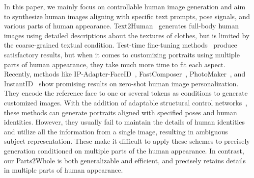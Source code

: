 In this paper, we mainly focus on controllable human image generation and aim to synthesize human images aligning with specific text prompts, pose signals, and various parts of human appearance. Text2Human~\cite{jiang2022text2human} generates full-body human images using detailed descriptions about the textures of clothes, but is limited by the coarse-grained textual condition. Test-time fine-tuning methods~\cite{ruiz2023dreambooth,hu2021lora,kumari2023customdiffusion} produce satisfactory results, but when it comes to customizing portraits using multiple parts of human appearance, they take much more time to fit each aspect. Recently, methods like IP-Adapter-FaceID~\cite{ye2023ipadapter}, FastComposer~\cite{xiao2023fastcomposer}, PhotoMaker~\cite{li2023photomaker}, and InstantID~\cite{wang2024instantid} show promising results on zero-shot human image personalization. They encode the reference face to one or several tokens as conditions to generate customized images. With the addition of adaptable structural control networks~\cite{zhang2023controlnet, mou2023t2iadapter}, these methods can generate portraits aligned with specified poses and human identities. However, they usually fail to maintain the details of human identities and utilize all the information from a single image, resulting in ambiguous subject representation. These make it difficult to apply these schemes to precisely generation conditioned on multiple parts of the human appearance. In contrast, our Parts2Whole is both generalizable and efficient, and precisely retains details in multiple parts of human appearance.